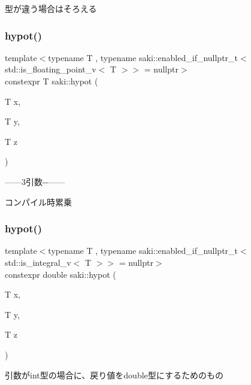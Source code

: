 型が違う場合はそろえる 

\mbox{\label{namespacesaki_a56768ecf1270205a8c9b3ac8cdf4a590}} 
\subsubsection{\texorpdfstring{hypot()}{hypot()}\hspace{0.1cm}{\footnotesize\ttfamily [4/6]}}
{\footnotesize\ttfamily template$<$typename T , typename saki\+::enabled\+\_\+if\+\_\+nullptr\+\_\+t$<$ std\+::is\+\_\+floating\+\_\+point\+\_\+v$<$ T $>$$>$  = nullptr$>$ \\
constexpr T saki\+::hypot (\begin{DoxyParamCaption}\item[{T}]{x,  }\item[{T}]{y,  }\item[{T}]{z }\end{DoxyParamCaption})}



------3引数-\/-\/------ 

コンパイル時累乗 \mbox{\label{namespacesaki_ad56e1232bb063b3bc0e7cf2b3f655247}} 
\subsubsection{\texorpdfstring{hypot()}{hypot()}\hspace{0.1cm}{\footnotesize\ttfamily [5/6]}}
{\footnotesize\ttfamily template$<$typename T , typename saki\+::enabled\+\_\+if\+\_\+nullptr\+\_\+t$<$ std\+::is\+\_\+integral\+\_\+v$<$ T $>$$>$  = nullptr$>$ \\
constexpr double saki\+::hypot (\begin{DoxyParamCaption}\item[{T}]{x,  }\item[{T}]{y,  }\item[{T}]{z }\end{DoxyParamCaption})}



引数がint型の場合に、戻り値をdouble型にするためのもの 

\mbox{\label{namespacesaki_ada6f15bbf909992e4840325c0dae0c42}} 
